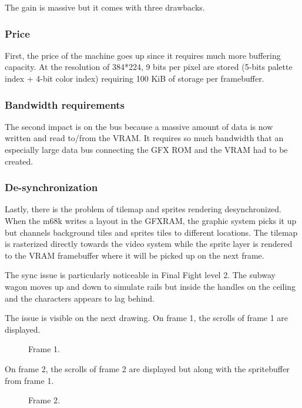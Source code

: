 The gain is massive but it comes with three drawbacks. 

\subsubsection{Price}
First, the price of the machine goes up since it requires much more buffering capacity. At the resolution of 384*224, 9 bits per pixel are stored (5-bits palette index + 4-bit color index) requiring 100 KiB of storage per framebuffer.

\subsubsection{Bandwidth requirements}
The second impact is on the bus because a massive amount of data is now written and read to/from the VRAM. It requires so much bandwidth that an especially large data bus connecting the GFX ROM and the VRAM had to be created.

\subsubsection{De-synchronization}
Lastly, there is the problem of tilemap and sprites rendering desynchronized. When the m68k writes a layout in the GFXRAM, the graphic system picks it up but channels background tiles and sprites tiles to different locations. The tilemap is rasterized directly towards the video system while the sprite layer is rendered to the VRAM framebuffer where it will be picked up on the next frame.
 

\begin{trivia}
The sync issue is particularly noticeable in Final Fight level 2. The subway wagon moves up and down to simulate rails but inside the handles on the ceiling and the characters appears to lag behind.
\end{trivia}

The issue is visible on the next drawing. On frame 1, the scrolls of frame 1 are displayed. 

\begin{figure}[H]
 \caption*{Frame 1.}%
 \end{figure}%

On frame 2, the scrolls of frame 2 are displayed but along with the spritebuffer from frame 1.
 

\begin{figure}[H]
 \caption*{Frame 2.}%
 \end{figure}%

